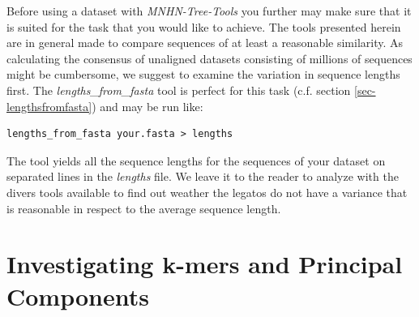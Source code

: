 Before using a dataset with \emph{MNHN-Tree-Tools} you further may make
sure that it is suited for the task that you would like to
achieve. The tools presented herein are in general made to
compare sequences of at least a reasonable similarity. As calculating
the consensus of unaligned datasets consisting of millions of
sequences might be cumbersome, we suggest to
examine the variation in sequence lengths first. The
\emph{lengths\_from\_fasta} tool is perfect for this task (c.f. section
\ref{sec-lengthsfromfasta}) and may be run like:
\begin{lstlisting}
lengths_from_fasta your.fasta > lengths
\end{lstlisting}
The tool yields all the sequence lengths for the sequences of your
dataset on separated lines in the \emph{lengths} file. We leave it to
the reader to analyze with the divers tools available to find out weather
the legatos do not have a variance that is reasonable in respect to
the average sequence length. 

\section{Investigating k-mers and Principal Components}


